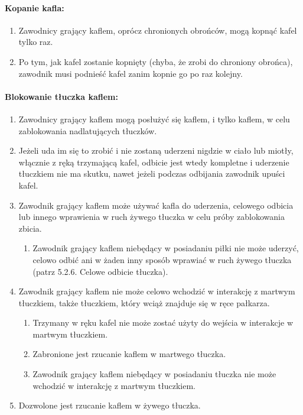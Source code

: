 \documentclass[12pt]{article}
\begin{document}
\paragraph{Kopanie kafla:}

\begin{enumerate}
\item
    Zawodnicy grający kaflem, oprócz chronionych obrońców, mogą kopnąć
  kafel tylko raz.
  \item
    Po tym, jak kafel zostanie kopnięty (chyba, że zrobi do chroniony
  obrońca), zawodnik musi podnieść kafel zanim kopnie go po raz kolejny.
  \end{enumerate}

\paragraph{Blokowanie tłuczka kaflem: }

\begin{enumerate}
\item
    Zawodnicy grający kaflem mogą posłużyć się kaflem, i tylko kaflem, w
  celu zablokowania nadlatujących tłuczków.
  \item
    Jeżeli uda im się to zrobić i nie zostaną uderzeni nigdzie w ciało lub
  miotły, włącznie z ręką trzymającą kafel, odbicie jest wtedy kompletne
  i uderzenie tłuczkiem nie ma skutku, nawet jeżeli podczas odbijania
  zawodnik upuści kafel.
  \item
    Zawodnik grający kaflem może używać kafla do uderzenia, celowego
  odbicia lub innego wprawienia w ruch żywego tłuczka w celu próby
  zablokowania zbicia.
  
  \begin{enumerate}
  \item
        Zawodnik grający kaflem niebędący w posiadaniu piłki nie może
    uderzyć, celowo odbić ani w żaden inny sposób wprawiać w ruch żywego
    tłuczka (patrz 5.2.6. Celowe odbicie tłuczka).
      \end{enumerate}
\item
    Zawodnik grający kaflem nie może celowo wchodzić w interakcję z
  martwym tłuczkiem, także tłuczkiem, który wciąż znajduje się w ręce
  pałkarza.
  
  \begin{enumerate}
  \item
        Trzymany w ręku kafel nie może zostać użyty do wejścia w interakcje
    w martwym tłuczkiem.
      \item
        Zabronione jest rzucanie kaflem w martwego tłuczka.
      \item
        Zawodnik grający kaflem niebędący w posiadaniu tłuczka nie może
    wchodzić w interakcję z martwym tłuczkiem.
      \end{enumerate}
\item
    Dozwolone jest rzucanie kaflem w żywego tłuczka.
  \end{enumerate}
\end{document}
